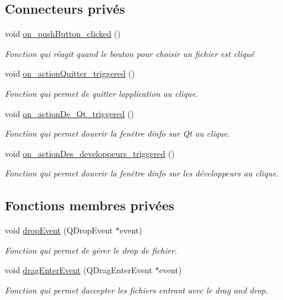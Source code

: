 \subsection*{Connecteurs privés}
\begin{DoxyCompactItemize}
\item 
void \hyperlink{classMainWindowLaunchDialog_a4464510ed5080984f0af0d3c0559f9eb}{on\+\_\+push\+Button\+\_\+clicked} ()
\begin{DoxyCompactList}\small\item\em Fonction qui réagit quand le bouton pour choisir un fichier est cliqué \end{DoxyCompactList}\item 
void \hyperlink{classMainWindowLaunchDialog_aad807a24560cbcb3d864a1c6b678537e}{on\+\_\+action\+Quitter\+\_\+triggered} ()
\begin{DoxyCompactList}\small\item\em Fonction qui permet de quitter l\textquotesingle{}application au clique. \end{DoxyCompactList}\item 
void \hyperlink{classMainWindowLaunchDialog_a91bfa59302a3591b7b3b11b03d6f9b0e}{on\+\_\+action\+De\+\_\+\+Qt\+\_\+triggered} ()
\begin{DoxyCompactList}\small\item\em Fonction qui permet d\textquotesingle{}ouvrir la fenêtre d\textquotesingle{}info sur Qt au clique. \end{DoxyCompactList}\item 
void \hyperlink{classMainWindowLaunchDialog_aaa766b56e4327b3bedf7f88c1b52cee7}{on\+\_\+action\+Des\+\_\+developpeurs\+\_\+triggered} ()
\begin{DoxyCompactList}\small\item\em Fonction qui permet d\textquotesingle{}ouvrir la fenêtre d\textquotesingle{}info sur les développeurs au clique. \end{DoxyCompactList}\end{DoxyCompactItemize}
\subsection*{Fonctions membres privées}
\begin{DoxyCompactItemize}
\item 
void \hyperlink{classMainWindowLaunchDialog_a6b292183d418fe79b79225d9a35bd3dd}{drop\+Event} (Q\+Drop\+Event $\ast$event)
\begin{DoxyCompactList}\small\item\em Fonction qui permet de gérer le drop de fichier. \end{DoxyCompactList}\item 
void \hyperlink{classMainWindowLaunchDialog_aaf393173ffd6c63b2c4d5bdd48b8ddb4}{drag\+Enter\+Event} (Q\+Drag\+Enter\+Event $\ast$event)
\begin{DoxyCompactList}\small\item\em Fonction qui permet d\textquotesingle{}accepter les fichiers entrant avec le drag and drop. \end{DoxyCompactList}\end{DoxyCompactItemize}
